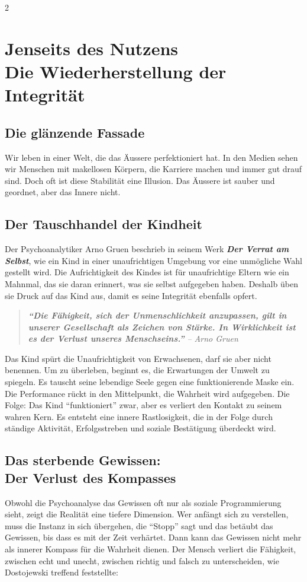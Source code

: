 \documentclass[a4paper,11pt]{article}
\begin{document}
\begin{multicols}{2}

  \section*{Jenseits des Nutzens\\
    \normalsize Die Wiederherstellung der Integrität}
\subsection*{Die glänzende Fassade}
Wir leben in einer Welt, die das Äussere perfektioniert hat. In den Medien sehen wir Menschen mit makellosen Körpern, die Karriere machen und immer gut drauf sind. Doch oft ist diese Stabilität eine Illusion. Das Äussere ist sauber und geordnet, aber das Innere nicht.
\subsection*{Der Tauschhandel der Kindheit}
Der Psychoanalytiker Arno Gruen beschrieb in seinem Werk \textit{\bfseries Der Verrat am Selbst}, wie ein Kind in einer unaufrichtigen Umgebung vor eine unmögliche Wahl gestellt wird. Die Aufrichtigkeit des Kindes ist für unaufrichtige Eltern wie ein Mahnmal, das sie daran erinnert, was sie selbst aufgegeben haben. Deshalb üben sie Druck auf das Kind aus, damit es seine Integrität ebenfalls opfert.
\begin{quote}
 \itshape \textbf{``Die Fähigkeit, sich der Unmenschlichkeit anzupassen, gilt in unserer Gesellschaft als Zeichen von Stärke. In Wirklichkeit ist es der Verlust unseres Menschseins.''} -- Arno Gruen
\end{quote}
Das Kind spürt die Unaufrichtigkeit von Erwachsenen, darf sie aber nicht benennen. Um zu überleben, beginnt es, die Erwartungen der Umwelt zu spiegeln. Es tauscht seine lebendige Seele gegen eine funktionierende Maske ein. Die Performance rückt in den Mittelpunkt, die Wahrheit wird aufgegeben.
Die Folge: Das Kind ``funktioniert'' zwar, aber es verliert den Kontakt zu seinem wahren Kern. Es entsteht eine innere Rastlosigkeit, die in der Folge durch ständige Aktivität, Erfolgsstreben und soziale Bestätigung überdeckt wird.
\subsection*{Das sterbende Gewissen:\\Der Verlust des Kompasses}
Obwohl die Psychoanalyse das Gewissen oft nur als soziale Programmierung sieht, zeigt die Realität eine tiefere Dimension. Wer anfängt sich zu verstellen, muss die Instanz in sich übergehen, die ``Stopp'' sagt und das betäubt das Gewissen, bis dass es mit der Zeit verhärtet. Dann kann das Gewissen nicht mehr als innerer Kompass für die Wahrheit dienen. Der Mensch verliert die Fähigkeit, zwischen echt und unecht, zwischen richtig und falsch zu unterscheiden, wie Dostojewski treffend feststellte:


\end{multicols}
\end{document}
